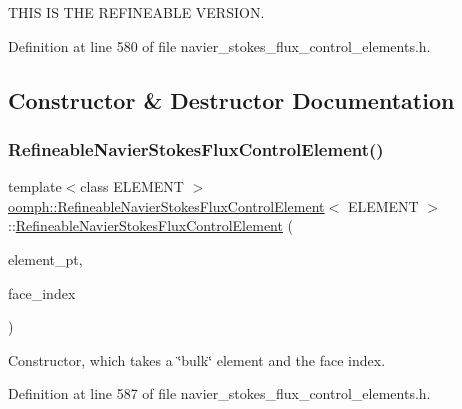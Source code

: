 T\+H\+IS IS T\+HE R\+E\+F\+I\+N\+E\+A\+B\+LE V\+E\+R\+S\+I\+ON. 

Definition at line 580 of file navier\+\_\+stokes\+\_\+flux\+\_\+control\+\_\+elements.\+h.



\subsection{Constructor \& Destructor Documentation}
\mbox{\label{classoomph_1_1RefineableNavierStokesFluxControlElement_aef769904942c35ba967e427d02e540e5}} 
\subsubsection{\texorpdfstring{Refineable\+Navier\+Stokes\+Flux\+Control\+Element()}{RefineableNavierStokesFluxControlElement()}}
{\footnotesize\ttfamily template$<$class E\+L\+E\+M\+E\+NT $>$ \\
\hyperlink{classoomph_1_1RefineableNavierStokesFluxControlElement}{oomph\+::\+Refineable\+Navier\+Stokes\+Flux\+Control\+Element}$<$ E\+L\+E\+M\+E\+NT $>$\+::\hyperlink{classoomph_1_1RefineableNavierStokesFluxControlElement}{Refineable\+Navier\+Stokes\+Flux\+Control\+Element} (\begin{DoxyParamCaption}\item[{\hyperlink{classoomph_1_1FiniteElement}{Finite\+Element} $\ast$const \&}]{element\+\_\+pt,  }\item[{const int \&}]{face\+\_\+index }\end{DoxyParamCaption})\hspace{0.3cm}{\ttfamily [inline]}}



Constructor, which takes a \char`\"{}bulk\char`\"{} element and the face index. 



Definition at line 587 of file navier\+\_\+stokes\+\_\+flux\+\_\+control\+\_\+elements.\+h.

